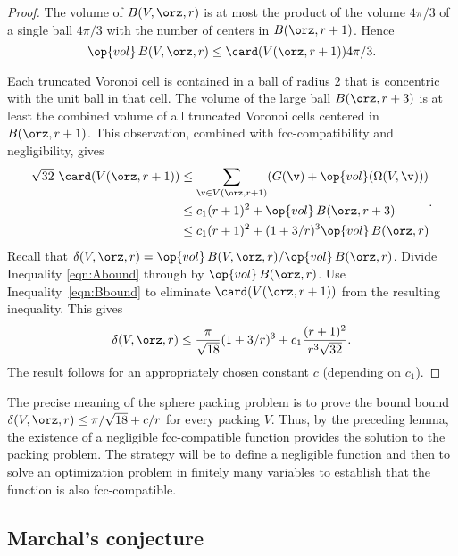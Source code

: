 \begin{proof}
The volume of $B( V,\orz,r)$ is at most the product of the volume
$4\pi/3$ of a single ball $4\pi/3$ with the number of centers in
$B(\orz,r+1)$.  Hence
\begin{equation}
\op{vol}\, B( V,\orz,r) \le \card( V(\orz,r+1)) 4\pi/3.
\label{eqn:Abound}
\end{equation}

Each truncated Voronoi cell is contained in a ball of
radius $2$ that is concentric with the unit ball in that cell.  The volume
of the large ball $B(\orz,r+3)$ is at least the combined volume of 
all truncated Voronoi
cells centered in $B(\orz,r+1)$. This observation,
combined with fcc-compatibility and negligibility, gives
\begin{equation}
\begin{split}
\sqrt{32}\,\,\card( V(\orz,r+1))
&\le \sum_{\v\in V(\orz,r+1)} (G(\v) +
\op{vol}(\Omega(V,\v))) \\
&\le c_1 (r+1)^2 + \op{vol}\,B(\orz,r+3) \\
&\le c_1 (r+1)^2 + (1+3/r)^3 \op{vol}\,B(\orz,r)
\label{eqn:Bbound}
\end{split}.
\end{equation}
%
Recall that $\delta( V,\orz,r)=
\op{vol}\,B( V,\orz,r)/\op{vol}\,B(\orz,r)$. Divide Inequality
\ref{eqn:Abound} through by $\op{vol}\,B(\orz,r)$.  Use
Inequality~\ref{eqn:Bbound} to eliminate $\card( V(\orz,r+1))$ from the
resulting inequality.  This gives
\begin{displaymath}\delta( V,\orz,r)
\le \frac{\pi}{\sqrt{18}} (1+3/r)^3 + c_1 \frac{(r+1)^2}{r^3\sqrt{32}}.
\end{displaymath}
The result follows for an appropriately chosen constant $c$
(depending on $c_1$).
\end{proof}

\begin{remark} \label{remark:precise} The precise meaning of the
sphere packing problem is to prove the bound bound $\delta( V,\orz,r)
\le \pi/\sqrt{18} + c/r$ for every packing $ V$.  Thus, by the
preceding lemma, the existence of a negligible fcc-compatible
function provides the solution to the packing problem.  The strategy
will be to define a negligible function and then to solve an
optimization problem in finitely many variables to establish that
the function is also fcc-compatible.
\end{remark}


\subsection{Marchal's conjecture}

